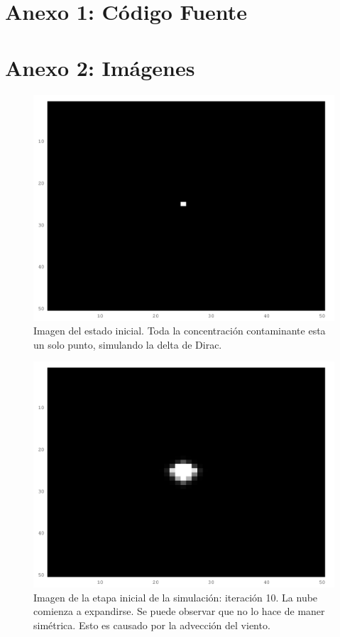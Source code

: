 \documentclass[twocolumn,a4paper,10pt]{article}
\begin{document}
\clearpage
\section*{Anexo 1: C\'odigo Fuente}

    

\clearpage
\section*{Anexo 2: Im\'agenes}

\begin{figure}[H]
        \includegraphics[width=\linewidth]{./images/iteration-1.png}
        \caption{Imagen del estado inicial. Toda la concentraci\'on contaminante esta un solo punto, simulando la delta de Dirac.}
        \label{fig:inicial}
\end{figure}

\begin{figure}[H]
        \includegraphics[width=\linewidth]{./images/iteration-10.png}
        \caption{Imagen de la etapa inicial de la simulaci\'on: iteraci\'on 10. La nube comienza a expandirse. Se puede observar que no lo hace de maner sim\'etrica. 
        Esto es causado por la advecci\'on del viento.}
        \label{fig:10-iteraciones}
\end{figure}
\end{document}
